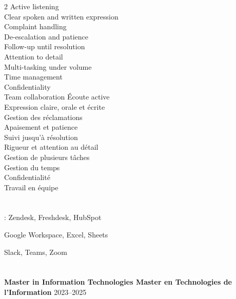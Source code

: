 \documentclass[10pt,a4paper]{article}
\begin{document}
\begin{paracol}{2}
{
Active listening \\
Clear spoken and written expression \\
Complaint handling \\
De-escalation and patience \\
Follow-up until resolution \\
Attention to detail \\
Multi-tasking under volume \\
Time management \\
Confidentiality \\
Team collaboration
}
{
Écoute active \\
Expression claire, orale et écrite \\
Gestion des réclamations \\
Apaisement et patience \\
Suivi jusqu'à résolution \\
Rigueur et attention au détail \\
Gestion de plusieurs tâches \\
Gestion du temps \\
Confidentialité \\
Travail en équipe
}


\section*{}

: Zendesk, Freshdesk, HubSpot

Google Workspace, Excel, Sheets

Slack, Teams, Zoom




\section*{}

\textbf{
{Master in Information Technologies}
{Master en Technologies de l'Information}
}\hfill 2023--2025


\end{paracol}
\end{document}
